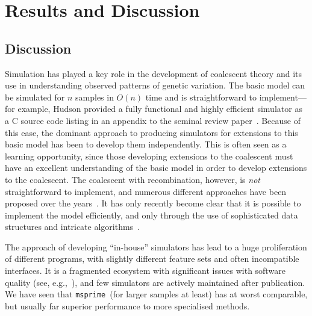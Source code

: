 \documentclass{article}
\newcommand{\msprime}[0]{\texttt{msprime}}
\begin{document}

\section{Results and Discussion}

\subsection{Discussion}
Simulation has played a key role in the development of coalescent theory
and its use in understanding observed patterns of genetic variation.
The basic model can be simulated for $n$ samples in $O(n)$ time
and is straightforward to implement---for example, Hudson provided a fully
functional and highly efficient simulator as a C source code listing in an
appendix to the seminal review paper~\citep{hudson1990gene}. Because of
this ease, the dominant approach to producing simulators for extensions
to this basic model has been to develop them independently. This is
often seen as a learning opportunity, since those developing extensions
to the coalescent must have an excellent understanding of the basic
model in order to develop extensions to the coalescent.
The coalescent with recombination, however, is \emph{not} straightforward
to implement, and numerous different approaches have been
proposed over the
years~\citep{hudson1983properties,griffiths1997ancestral,wiuf1999recombination,
mcvean2005approximating}. It has only recently become clear that it is
possible to implement the model efficiently, and only through the use
of sophisticated data structures and
intricate algorithms~\citep{kelleher2016efficient}.

The approach of developing ``in-house'' simulators
has lead to a huge proliferation of different programs, with
slightly different feature sets and often incompatible interfaces.
It is a fragmented ecosystem with significant issues with software
quality (see, e.g.,~\cite{yang2014critical}),
and few simulators are actively maintained after publication.
We have seen that \msprime\ (for larger samples at least)
has at worst comparable, but usually far superior
performance to more specialised methods.
\end{document}
